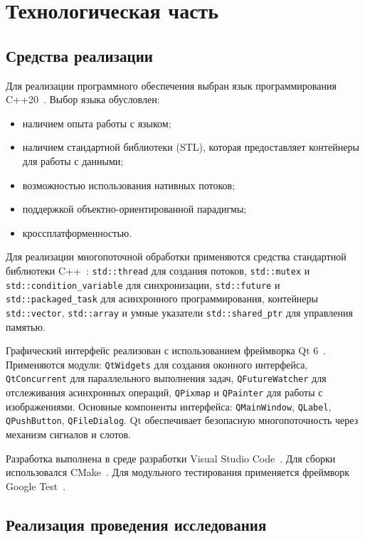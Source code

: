 \section{Технологическая часть}
\subsection{Средства реализации}

Для реализации программного обеспечения выбран язык программирования C++20~\cite{cpp-standard}.
Выбор языка обусловлен:
\begin{itemize}
    \item наличием опыта работы с языком;
    \item наличием стандартной библиотеки (STL), которая предоставляет контейнеры для работы с данными;
    \item возможностью использования нативных потоков;
    \item поддержкой объектно-ориентированной парадигмы;
    \item кроссплатформенностью.
\end{itemize}

Для реализации многопоточной обработки применяются средства стандартной библиотеки C++~\cite{cpp-standard}: \texttt{std::thread} для создания потоков, \texttt{std::mutex} и \texttt{std::condition\_variable} для синхронизации, \texttt{std::future} и \texttt{std::packaged\_task} для асинхронного программирования, контейнеры \texttt{std::vector}, \texttt{std::array} и умные указатели \texttt{std::shared\_ptr} для управления памятью.

Графический интерфейс реализован с использованием фреймворка Qt 6~\cite{qt6-doc}.
Применяются модули: \texttt{QtWidgets} для создания оконного интерфейса, \texttt{QtConcurrent}
для параллельного выполнения задач, \texttt{QFutureWatcher}
для отслеживания асинхронных операций, \texttt{QPixmap} и \texttt{QPainter} для работы с изображениями.
Основные компоненты интерфейса: \texttt{QMainWindow}, \texttt{QLabel}, \texttt{QPushButton}, \texttt{QFileDialog}.
Qt обеспечивает безопасную многопоточность через механизм сигналов и слотов.

Разработка выполнена в среде разработки Visual Studio Code~\cite{vscode}. Для сборки использовался CMake~\cite{cmake}.
Для модульного тестирования применяется фреймворк Google Test~\cite{gtest}.

\subsection{Реализация проведения исследования}

